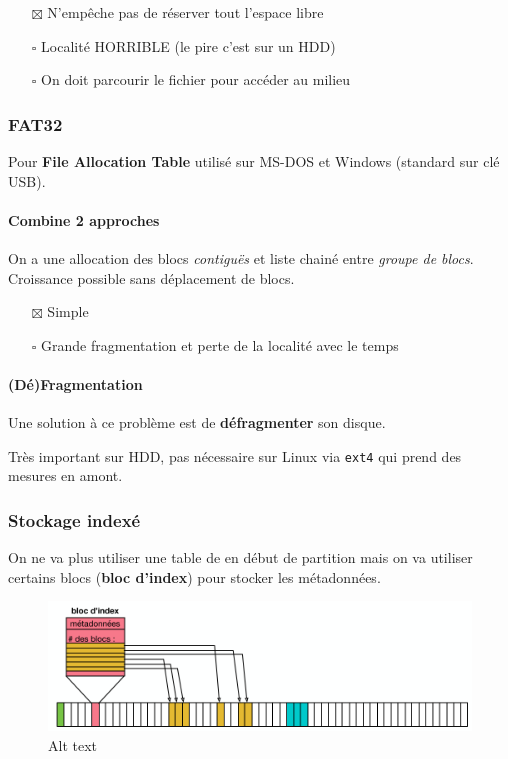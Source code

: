 \begin{itemize}
\tightlist
\item[$\boxtimes$]
  N'empêche pas de réserver tout l'espace libre
\item[$\square$]
  Localité HORRIBLE (le pire c'est sur un HDD)
\item[$\square$]
  On doit parcourir le fichier pour accéder au milieu
\end{itemize}

\subsubsection{FAT32}\label{fat32}

Pour \textbf{File Allocation Table} utilisé sur MS-DOS et Windows
(standard sur clé USB).

\paragraph{Combine 2 approches}\label{combine-2-approches}

On a une allocation des blocs \emph{contiguës} et liste chainé entre
\emph{groupe de blocs}. Croissance possible sans déplacement de blocs.

\begin{itemize}
\tightlist
\item[$\boxtimes$]
  Simple
\item[$\square$]
  Grande fragmentation et perte de la localité avec le temps
\end{itemize}

\paragraph{(Dé)Fragmentation}\label{duxe9fragmentation}

Une solution à ce problème est de \textbf{défragmenter} son disque.

Très important sur HDD, pas nécessaire sur Linux via \texttt{ext4} qui
prend des mesures en amont.

\subsubsection{Stockage indexé}\label{stockage-indexuxe9}

On ne va plus utiliser une table de en début de partition mais on va
utiliser certains blocs (\textbf{bloc d'index}) pour stocker les
métadonnées.

\begin{figure}
\centering
\includegraphics{image-43.png}
\caption{Alt text}
\end{figure}

